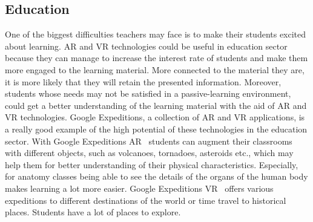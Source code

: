\documentclass[12pt]{article}
\begin{document}
\subsection{Education} \label{sec:Education}
One of the biggest difficulties teachers may face is to make their students excited about learning. \ac{AR} and \ac{VR} technologies could be useful in education sector because they can manage to increase the interest rate of students and make them more engaged to the learning material. More connected to the material they are, it is more likely that they will retain the presented information. Moreover, students whose needs may not be satisfied in a passive-learning environment, could get a better understanding of the learning material with the aid of \ac{AR} and \ac{VR} technologies. Google Expeditions, a collection of \ac{AR} and \ac{VR} applications, is a really good example of the high potential of these technologies in the education sector. With Google Expeditions \ac{AR}~\cite{googleExpeditionsVideo} students can augment their classrooms with different objects, such as volcanoes, tornadoes, asteroids etc., which may help them for better understanding of their physical characteristics. Especially, for anatomy classes being able to see the details of the organs of the human body makes learning a lot more easier. Google Expeditions \ac{VR}~\cite{googleExpeditionsVRList} offers various expeditions to different destinations of the world or time travel to historical places. Students have a lot of places to explore. 
\end{document}
